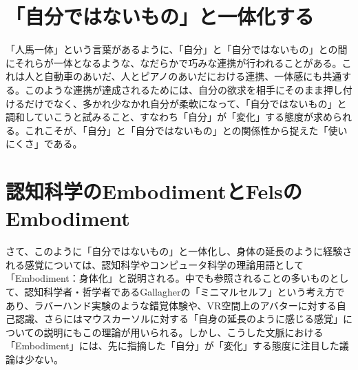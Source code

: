 
\section*{「自分ではないもの」と一体化する}
「人馬一体」という言葉があるように、「自分」と「自分ではないもの」との間にそれらが一体となるような、なだらかで巧みな連携が行われることがある。これは人と自動車のあいだ、人とピアノのあいだにおける連携、一体感にも共通する。このような連携が達成されるためには、自分の欲求を相手にそのまま押し付けるだけでなく、多かれ少なかれ自分が柔軟になって、「自分ではないもの」と調和していこうと試みること、すなわち「自分」が「変化」する態度が求められる。これこそが、「自分」と「自分ではないもの」との関係性から捉えた「使いにくさ」である。

\section*{認知科学のEmbodimentとFelsのEmbodiment}
さて、このように「自分ではないもの」と一体化し、身体の延長のように経験される感覚については、認知科学やコンピュータ科学の理論用語として「Embodiment：身体化」と説明される。中でも参照されることの多いものとして、認知科学者・哲学者であるGallagher\cite{Gallagher2000}の「ミニマルセルフ」という考え方であり、ラバーハンド実験のような錯覚体験や、VR空間上のアバターに対する自己認識、さらにはマウスカーソルに対する「自身の延長のように感じる感覚」についての説明\cite{Watanabe2013}にもこの理論が用いられる。しかし、こうした文脈における「Embodiment」には、先に指摘した「自分」が「変化」する態度に注目した議論は少ない。

